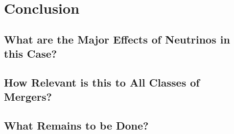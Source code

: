 \chapter{Conclusion}
\label{chap:conclusion}

\section{What are the Major Effects of Neutrinos in this Case?}

\section{How Relevant is this to All Classes of Mergers?}

\section{What Remains to be Done?}
